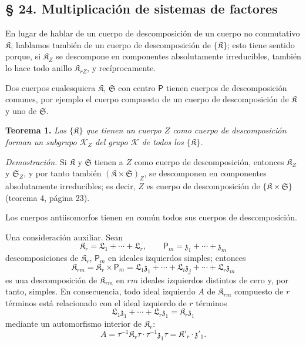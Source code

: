 \subsection*{§ 24. Multiplicación de sistemas de factores}\label{multiplikation-von-faktorensystemen}

En lugar de hablar de un cuerpo de descomposición de un cuerpo no conmutativo \(\mathfrak K\), hablamos también de un cuerpo de descomposición de \(\{\mathfrak K\}\); esto tiene sentido porque, si \(\mathfrak K_Z\) se descompone en componentes absolutamente irreducibles, también lo hace todo anillo \(\mathfrak K_{rZ}\), y recíprocamente.

Dos cuerpos cualesquiera \(\mathfrak K\), \(\mathfrak S\) con centro \(\mathsf P\) tienen cuerpos de descomposición comunes, por ejemplo el cuerpo compuesto de un cuerpo de descomposición de \(\mathfrak K\) y uno de \(\mathfrak S\).

\textbf{Teorema 1.} \emph{Los \(\{\mathfrak K\}\) que tienen un cuerpo \(Z\) como cuerpo de descomposición forman un subgrupo \(\mathscr K_Z\) del grupo \(\mathscr K\) de todos los \(\{\mathfrak K\}\).}

\emph{Demostración.} Si \(\mathfrak K\) y \(\mathfrak S\) tienen a \(Z\) como cuerpo de descomposición, entonces \(\mathfrak K_Z\) y \(\mathfrak S_Z\), y por tanto también \((\mathfrak K\times\mathfrak S)_Z\), se descomponen en componentes absolutamente irreducibles; es decir, \(Z\) es cuerpo de descomposición de \(\{\mathfrak K\times\mathfrak S\}\) (teorema 4, página 23).

Los cuerpos antiisomorfos tienen en común todos sus cuerpos de descomposición.

Una consideración auxiliar. Sean
\[
\mathfrak K_r=\mathfrak L_1+\cdots+\mathfrak L_r,\qquad
\mathsf P_m=\mathfrak z_1+\cdots+\mathfrak z_m
\]
descomposiciones de \(\mathfrak K_r\), \(\mathsf P_m\) en ideales izquierdos simples; entonces
\[
\mathfrak K_{rm}=\mathfrak K_r\times\mathsf P_m
=\mathfrak L_1\mathfrak z_1+\cdots+\mathfrak L_i\mathfrak z_j+\cdots+\mathfrak L_r\mathfrak z_m
\]
es una descomposición de \(\mathfrak K_{rm}\) en \(rm\) ideales izquierdos distintos de cero y, por tanto, simples. En consecuencia, todo ideal izquierdo \(A\) de \(\mathfrak K_{rm}\) compuesto de \(r\) términos está relacionado con el ideal izquierdo de \(r\) términos
\[
\mathfrak L_1\mathfrak z_1+\cdots+\mathfrak L_r\mathfrak z_1=\mathfrak K_r\mathfrak z_1
\]
mediante un automorfismo interior de \(\mathfrak K_r\):
\[
A=\tau^{-1}\mathfrak K_r\tau\cdot\tau^{-1}\mathfrak z_1\tau
=\mathfrak K'_r\cdot\mathfrak z'_1.
\]

